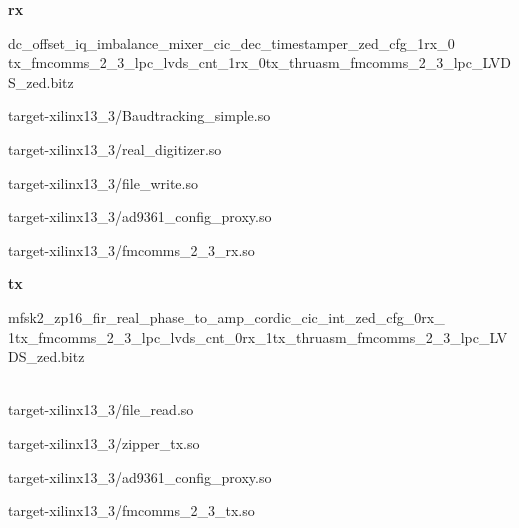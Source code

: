 \begin{appendices}
	\textbf{rx}
	\begin{itemize}
  \item dc\_offset\_iq\_imbalance\_mixer\_cic\_dec\_timestamper\_zed\_cfg\_1rx\_0\\
tx\_fmcomms\_2\_3\_lpc\_lvds\_cnt\_1rx\_0tx\_thruasm\_fmcomms\_2\_3\_lpc\_LVDS\_zed.bitz \\
	\begin{minipage}[t]{.5\textwidth}
	\item target-xilinx13\_3/Baudtracking\_simple.so
	\item target-xilinx13\_3/real\_digitizer.so
	\item target-xilinx13\_3/file\_write.so
	\end{minipage}
	\begin{minipage}[t]{.5\textwidth}
	\item target-xilinx13\_3/ad9361\_config\_proxy.so
	\item target-xilinx13\_3/fmcomms\_2\_3\_rx.so
	\end{minipage}
	\end{itemize}

	\textbf{tx}
	\begin{itemize}
  \item mfsk2\_zp16\_fir\_real\_phase\_to\_amp\_cordic\_cic\_int\_zed\_cfg\_0rx\_\\
1tx\_fmcomms\_2\_3\_lpc\_lvds\_cnt\_0rx\_1tx\_thruasm\_fmcomms\_2\_3\_lpc\_LVDS\_zed.bitz
\\ \\
	\begin{minipage}[t]{.5\textwidth}
	\item target-xilinx13\_3/file\_read.so
	\item target-xilinx13\_3/zipper\_tx.so
	\end{minipage}
	\begin{minipage}[t]{.5\textwidth}
	\item target-xilinx13\_3/ad9361\_config\_proxy.so
	\item target-xilinx13\_3/fmcomms\_2\_3\_tx.so
	\end{minipage}
	\end{itemize}


\end{appendices}
